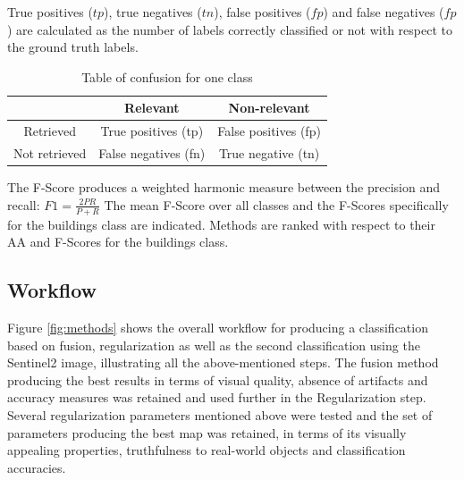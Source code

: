 \documentclass[10pt]{article}
\begin{document}
\begin{itemize}
\begin{itemize}
    \end{itemize}
    True positives ($tp$), true negatives ($tn$), false positives ($fp$) and false negatives ($fp$) are calculated as the number of labels correctly classified or not with respect to the ground truth labels.
    \begin{table}[H]
        \centering
        \begin{tabular}{c|c|c}
    	    & Relevant & Non-relevant \\\hline
    	    Retrieved & True positives (tp) & False positives (fp) \\\hline
    	    Not retrieved & False negatives (fn) & True negative (tn)
        \end{tabular}
        \caption{Table of confusion for one class}
    \end{table}
    The F-Score produces a weighted harmonic measure between the precision and recall:
	$F1=\frac{2PR}{P+R}$
    The mean F-Score over all classes and the F-Scores specifically for the buildings class are indicated. Methods are ranked with respect to their AA and F-Scores for the buildings class.
\end{itemize}


\subsection{Workflow}
Figure \ref{fig:methods} shows the overall workflow for producing a classification based on fusion, regularization as well as the second classification using the Sentinel2 image, illustrating all the above-mentioned steps. The fusion method producing the best results in terms of visual quality, absence of artifacts and accuracy measures was retained and used further in the Regularization step. Several regularization parameters mentioned above were tested and the set of parameters producing the best map was retained, in terms of its visually appealing properties, truthfulness to real-world objects and classification accuracies.
\end{document}
